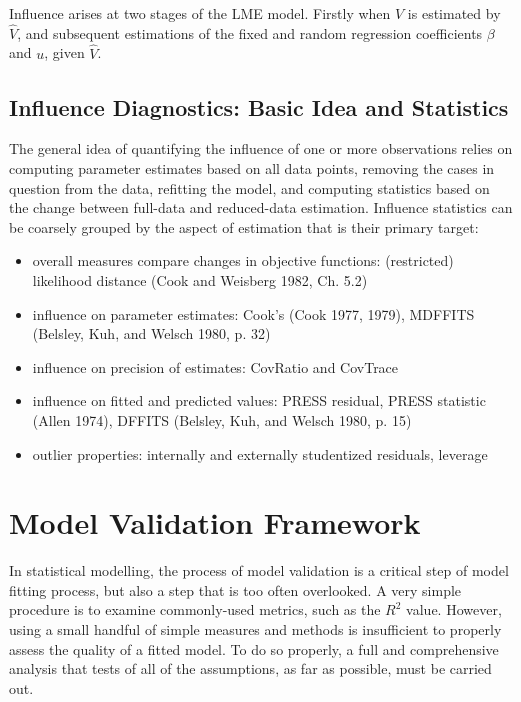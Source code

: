 \documentclass[12pt, a4paper]{article}
\begin{document}
	Influence arises at two stages of the LME model. Firstly when $V$ is estimated by $\hat{V}$, and subsequent
	estimations of the fixed and random regression coefficients $\beta$ and $u$, given $\hat{V}$.
	
\subsection{Influence Diagnostics: Basic Idea and Statistics}

The general idea of quantifying the influence of one or more observations relies on computing parameter estimates based on all data points, removing the cases in question from the data, refitting the model, and computing statistics based on the change between full-data and reduced-data estimation. Influence statistics can be coarsely grouped by the aspect of estimation that is their primary target:
\begin{itemize}
	\item overall measures compare changes in objective functions: (restricted) likelihood distance (Cook and Weisberg 1982, Ch. 5.2)
	\item influence on parameter estimates: Cook's  (Cook 1977, 1979), MDFFITS (Belsley, Kuh, and Welsch 1980, p. 32)
	\item influence on precision of estimates: CovRatio and CovTrace
	\item influence on fitted and predicted values: PRESS residual, PRESS statistic (Allen 1974), DFFITS (Belsley, Kuh, and Welsch 1980, p. 15)
	\item outlier properties: internally and externally studentized residuals, leverage
\end{itemize}
\section{Model Validation Framework}
In statistical modelling, the process of model validation is a critical step of model fitting process, but also a step that is too often overlooked. A very simple procedure is to examine commonly-used
metrics, such as the $R^2$ value. However, using a small handful of simple measures and methods is insufficient to properly assess the quality of a fitted model. To do so properly, a full and comprehensive
analysis that tests of all of the assumptions, as far as possible, must be carried out.
\end{document}
